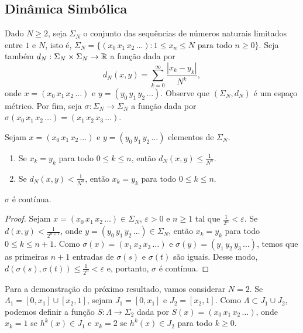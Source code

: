 \subsection{Dinâmica Simbólica}

Dado $N \geq 2$, seja $\Sigma_N$ o conjunto das sequências de números naturais limitados entre $1$ e $N$, isto é, $\Sigma_N = \lbrace (x_0 \, x_1 \, x_2 \, \dots) : 1 \leq x_n \leq N  \text{ para todo } n \geq 0 \rbrace$.
Seja também $d_N : \Sigma_N \times \Sigma_N \to \mathbb{R}$ a função dada por
$$d_N(x, y) = \sum_{k=0}^\infty \frac{|x_k - y_k|}{N^k},$$
onde $x = (x_0 \, x_1 \, x_2 \, \dots)$ e $y = (y_0 \, y_1 \, y_2 \, \dots)$.
Observe que $(\Sigma_N, d_N)$ é um espaço métrico.
Por fim, seja $\sigma: \Sigma_N \to \Sigma_N$ a função dada por $\sigma(x_0 \, x_1 \, x_2 \, \dots) = (x_1 \, x_2 \, x_3 \, \dots)$.

\begin{proposition}
Sejam $x = (x_0 \, x_1 \, x_2 \, \dots)$ e $y = (y_0 \, y_1 \, y_2 \, \dots)$ elementos de $\Sigma_N$.
\begin{enumerate}
\item Se $x_k = y_k$ para todo $0 \leq k \leq n$, então $d_N(x, y) \leq \frac{1}{N^n}$.
\item Se $d_N(x, y) < \frac{1}{N^n}$, então $x_k = y_k$ para todo $0 \leq k \leq n$.
\end{enumerate}
\end{proposition}

\begin{proposition}
$\sigma$ é contínua.
\end{proposition}

\begin{proof}
Sejam $x = (x_0 \, x_1 \, x_2 \, \dots) \in \Sigma_N$, $\varepsilon > 0$ e $n \geq 1$ tal que $\frac{1}{2^n} < \varepsilon$.
Se $d(x, y) < \frac{1}{2^{n+1}}$, onde $y = (y_0 \, y_1 \, y_2 \, \dots) \in \Sigma_N$, então $x_k = y_k$ para todo $0 \leq k \leq n+1$.
Como $\sigma(x) = (x_1 \, x_2 \, x_3  \, \dots)$ e $\sigma(y) = (y_1 \, y_2 \, y_3 \, \dots)$, temos que as primeiras $n+1$ entradas de $\sigma(s)$ e $\sigma(t)$ são iguais. Desse modo,  $d(\sigma(s), \sigma(t)) \leq \frac{1}{2^n} < \varepsilon$ e, portanto, $\sigma$ é contínua.
\end{proof}

Para a demonstração do próximo resultado, vamos considerar $N = 2$.
Se $\Lambda_1 = [0, x_1] \cup [x_2, 1]$, sejam $J_1 = [0, x_1]$ e $J_2 = [x_2, 1]$.
Como $\Lambda \subset J_1 \cup J_2$, podemos definir a função $S: \Lambda \to \Sigma_2$ dada por $S(x) = (x_0 \, x_1 \, x_2 \, \dots)$, onde $x_k = 1$ se $h^k(x) \in J_1$ e $x_k = 2$ se $h^k(x) \in J_2$ para todo $k \geq 0$.

